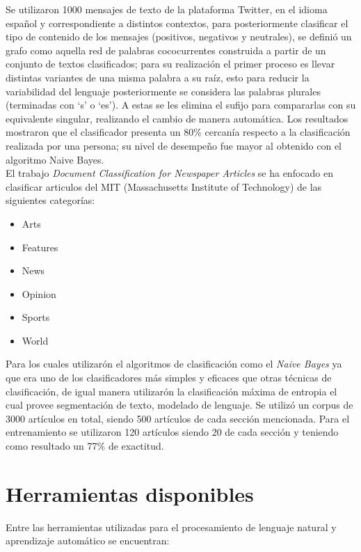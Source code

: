 	Se utilizaron 1000 mensajes de texto de la plataforma Twitter, en el idioma español y correspondiente a distintos contextos, para posteriormente clasificar el tipo de contenido de los mensajes (positivos, negativos y neutrales), se definió un grafo como aquella red de palabras co\-cocurrentes construida a partir de un conjunto de textos clasificados; para su realización el primer proceso es llevar distintas variantes de una misma palabra a su raíz, esto para reducir la variabilidad del lenguaje posteriormente se considera las palabras plurales (terminadas con ‘s’ o ‘es’). A estas se les elimina el sufijo para compararlas con su equivalente singular, realizando el cambio de manera automática.
	Los resultados mostraron que el clasificador presenta un 80\% cercanía respecto a la clasificación realizada por una persona; su nivel de desempeño fue mayor al obtenido con el algoritmo Naive Bayes.\\


	El trabajo \textit{Document Classification for Newspaper Articles} se ha enfocado en clasificar articulos del MIT (Massachusetts Institute of Technology) de las siguientes categorías:

	\begin{itemize}
		\item Arts
		\item Features
		\item News
		\item Opinion
		\item Sports
		\item World
	\end{itemize}

	Para los cuales utilizarón el algoritmos de clasificación como el \textit{Naive Bayes} ya que era uno de los clasificadores más simples y eficaces que otras técnicas de clasificación, de igual manera utilizarón la clasificación máxima de entropia el cual provee segmentación de texto, modelado de lenguaje.
	Se utilizó un corpus de 3000 artículos en total, siendo 500 artículos de cada sección mencionada. Para el entrenamiento se utilizaron 120 artículos siendo 20 de cada sección y teniendo como resultado un 77\% de exactitud.\\

\section{Herramientas disponibles}

	Entre las herramientas utilizadas para el procesamiento de lenguaje natural y aprendizaje automático se encuentran:

